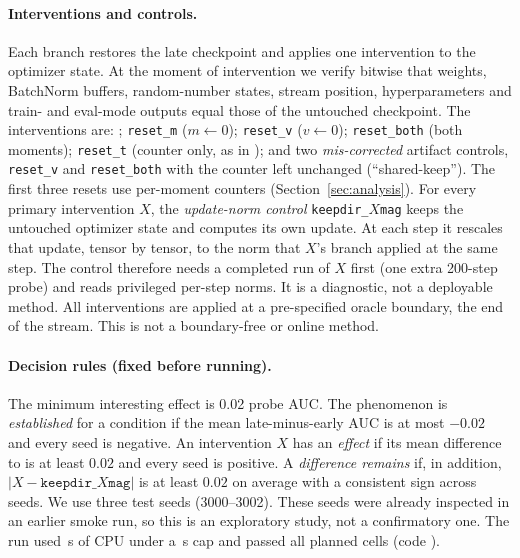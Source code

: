 \paragraph{Interventions and controls.}
Each branch restores the late checkpoint and applies one intervention to the optimizer state.
At the moment of intervention we verify bitwise that weights, BatchNorm buffers, random-number states,
stream position, hyperparameters and train- and eval-mode outputs equal those of the untouched
checkpoint. The interventions are:
\keep;
\texttt{reset\_m} ($m{\leftarrow}0$);
\texttt{reset\_v} ($v{\leftarrow}0$);
\texttt{reset\_both} (both moments);
\texttt{reset\_t} (counter only, as in \citealp{ellis2024adam}); and
two \emph{mis-corrected} artifact controls, \texttt{reset\_v} and \texttt{reset\_both} with the counter
left unchanged (``shared-keep'').
The first three resets use per-moment counters (Section~\ref{sec:analysis}). For every primary
intervention $X$, the \emph{update-norm control} \texttt{keepdir\_$X$mag} keeps the untouched optimizer
state and computes its own update. At each step it rescales that update, tensor by tensor, to the norm
that $X$'s branch applied at the same step. The control therefore needs a completed run of $X$ first
(one extra 200-step probe) and reads privileged per-step norms. It is a diagnostic, not a deployable
method. All interventions are applied at a pre-specified oracle boundary, the end of the stream. This is
not a boundary-free or online method.

\paragraph{Decision rules (fixed before running).}
The minimum interesting effect is 0.02 probe AUC.
The phenomenon is \emph{established} for a condition if the mean late-minus-early AUC is at most $-0.02$
and every seed is negative.
An intervention $X$ has an \emph{effect} if its mean difference to \keep{} is at least $0.02$ and every
seed is positive. A \emph{difference remains} if, in addition, $|X-\texttt{keepdir\_}X\texttt{mag}|$
is at least $0.02$ on average with a consistent sign across seeds.
We use three test seeds (3000--3002). These seeds were already inspected in an earlier smoke run, so
this is an exploratory study, not a confirmatory one. The run used \RunCpuSeconds{}\,s of CPU under a
\RunCpuCap{}\,s cap and passed all \RunCellsTotal{} planned cells (code \texttt{\RunCommit}).
